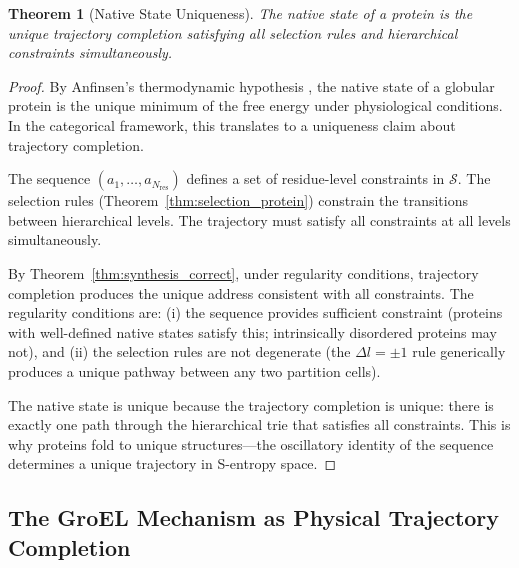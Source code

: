 \documentclass[11pt,twocolumn,a4paper]{article}
\newtheorem{theorem}{Theorem}[section]
\theoremstyle{definition}
\theoremstyle{remark}
\newcommand{\Sspace}{\mathcal{S}}
\newcommand{\Nres}{N_{\mathrm{res}}}
\begin{document}
\begin{theorem}[Native State Uniqueness]
\label{thm:native}
The native state of a protein is the unique trajectory completion satisfying all selection rules and hierarchical constraints simultaneously.
\end{theorem}

\begin{proof}
By Anfinsen's thermodynamic hypothesis \citep{anfinsen1973}, the native state of a globular protein is the unique minimum of the free energy under physiological conditions. In the categorical framework, this translates to a uniqueness claim about trajectory completion.

The sequence $(a_1, \ldots, a_{\Nres})$ defines a set of residue-level constraints in $\Sspace$. The selection rules (Theorem~\ref{thm:selection_protein}) constrain the transitions between hierarchical levels. The trajectory must satisfy all constraints at all levels simultaneously.

By Theorem~\ref{thm:synthesis_correct}, under regularity conditions, trajectory completion produces the unique address consistent with all constraints. The regularity conditions are: (i) the sequence provides sufficient constraint (proteins with well-defined native states satisfy this; intrinsically disordered proteins may not), and (ii) the selection rules are not degenerate (the $\Delta l = \pm 1$ rule generically produces a unique pathway between any two partition cells).

The native state is unique because the trajectory completion is unique: there is exactly one path through the hierarchical trie that satisfies all constraints. This is why proteins fold to unique structures---the oscillatory identity of the sequence determines a unique trajectory in S-entropy space.
\end{proof}

\subsection{The GroEL Mechanism as Physical Trajectory Completion}
\end{document}
